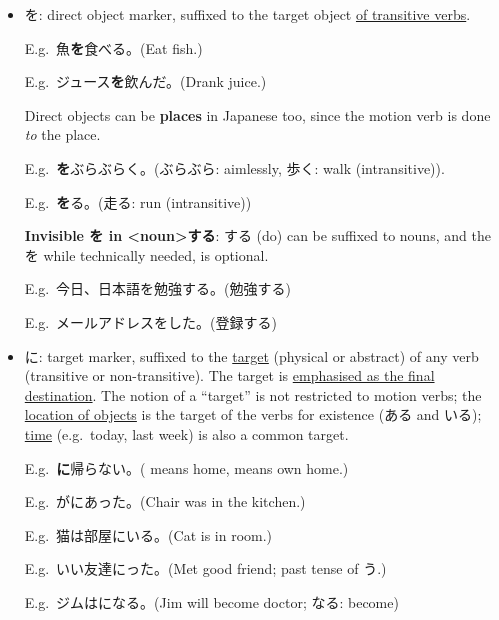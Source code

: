\documentclass[../nihongo-gakushuu-kyouzai.tex]{subfiles}
\begin{document}
\begin{itemize}
    \item を: direct object marker, suffixed to the target object \ul{of transitive verbs}.

    E.g.\ 魚\textbf{を}食べる。(Eat fish.)

    E.g.\ ジュース\textbf{を}飲んだ。(Drank juice.)

    Direct objects can be \textbf{places} in Japanese too, since the motion verb is done \emph{to} the place. 

    E.g.\ \textbf{を}ぶらぶらく。(ぶらぶら: aimlessly, 歩く: walk (intransitive)).

    E.g.\ \textbf{を}る。(走る: run (intransitive))

    \textbf{Invisible を in <noun>する}: する (do) can be suffixed to nouns, and the を while technically needed, is optional.

    E.g.\ 今日、日本語を勉強\cancel{[を]}する。(勉強\cancel{[を]}する)

    E.g.\ メールアドレスを\cancel{[を]}した。(登録\cancel{[を]}する)
    \item に: target marker, suffixed to the \ul{target} (physical or abstract) of any verb (transitive or non-transitive). The target is \ul{emphasised as the final destination}. The notion of a ``target'' is not restricted to motion verbs; the \ul{location of objects} is the target of the verbs for existence (ある and いる); \ul{time} (e.g.\ today, last week) is also a common target.


    E.g.\ \textbf{に}帰らない。( means home,  means own home.)


    E.g.\ がにあった。(Chair was in the kitchen.)

    E.g.\ 猫は部屋にいる。(Cat is in room.)

    E.g.\ いい友達にった。(Met good friend; past tense of う.)

    E.g.\ ジムはになる。(Jim will become doctor; なる: become)


\end{itemize}
\end{document}
